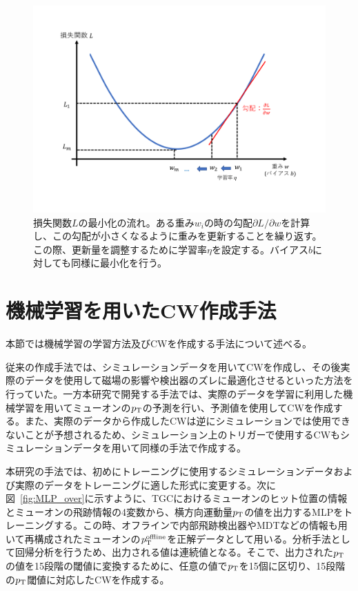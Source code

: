 \begin{figure}[tb]
  \centering
  \includegraphics[clip, width=15cm]{fig/4/lossfunc_laerning.pdf}
  \caption{損失関数$L$の最小化の流れ。ある重み$w_i$の時の勾配${\partial L}/{\partial w}$を計算し、この勾配が小さくなるように重みを更新することを繰り返す。この際、更新量を調整するために学習率$\eta$を設定する。バイアス$b$に対しても同様に最小化を行う。}
  \label{fig:lossfunction}
\end{figure}



\section{機械学習を用いたCW作成手法}
本節では機械学習の学習方法及びCWを作成する手法について述べる。

従来の作成手法では、シミュレーションデータを用いてCWを作成し、その後実際のデータを使用して磁場の影響や検出器のズレに最適化させるといった方法を行っていた。一方本研究で開発する手法では、実際のデータを学習に利用した機械学習を用いてミューオンの$p_{\rm{T}}$の予測を行い、予測値を使用してCWを作成する。また、実際のデータから作成したCWは逆にシミュレーションでは使用できないことが予想されるため、シミュレーション上のトリガーで使用するCWもシミュレーションデータを用いて同様の手法で作成する。

本研究の手法では、初めにトレーニングに使用するシミュレーションデータおよび実際のデータをトレーニングに適した形式に変更する。次に図~\ref{fig:MLP_over}に示すように、TGCにおけるミューオンのヒット位置の情報とミューオンの飛跡情報の4変数から、横方向運動量$p_{\rm{T}}$の値を出力するMLPをトレーニングする。この時、オフラインで内部飛跡検出器やMDTなどの情報も用いて再構成されたミューオンの$p_{\rm{T}}^{\rm{offline}}$を正解データとして用いる。分析手法として回帰分析を行うため、出力される値は連続値となる。そこで、出力された$p_{\rm{T}}$の値を15段階の閾値に変換するために、任意の値で$p_{\rm{T}}$を15個に区切り、15段階の$p_{\rm{T}}$閾値に対応したCWを作成する。

